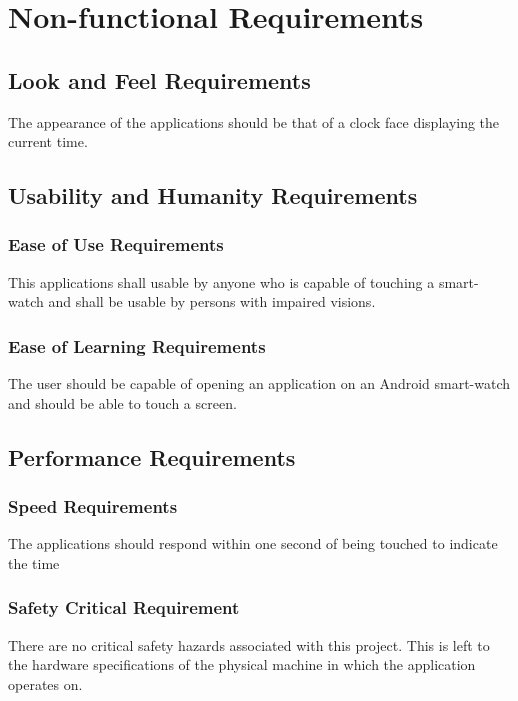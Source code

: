 \documentclass[12pt, titlepage]{article}
\begin{document}
\section{Non-functional Requirements}

\subsection{Look and Feel Requirements}

The appearance of the applications should be that of a clock face displaying the current time.

\subsection{Usability and Humanity Requirements}

\subsubsection{Ease of Use Requirements}

This applications shall usable by anyone who is capable of touching a smart-watch and shall be usable by persons with impaired visions.


\subsubsection{Ease of Learning Requirements}

The user should be capable of opening an application on an Android smart-watch and should be able to touch a screen. 

\subsection{Performance Requirements}

\subsubsection{Speed Requirements}

The applications should respond within one second of being touched to indicate the time

\subsubsection{Safety Critical Requirement}

There are no critical safety hazards associated with this project. This is left to the hardware specifications of the physical machine in which the application operates on. 
\end{document}

